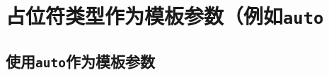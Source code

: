 \section{占位符类型作为模板参数（例如\texttt{auto}}\label{ch13}

\subsection{使用\texttt{auto}作为模板参数}\label{ch13.1}
